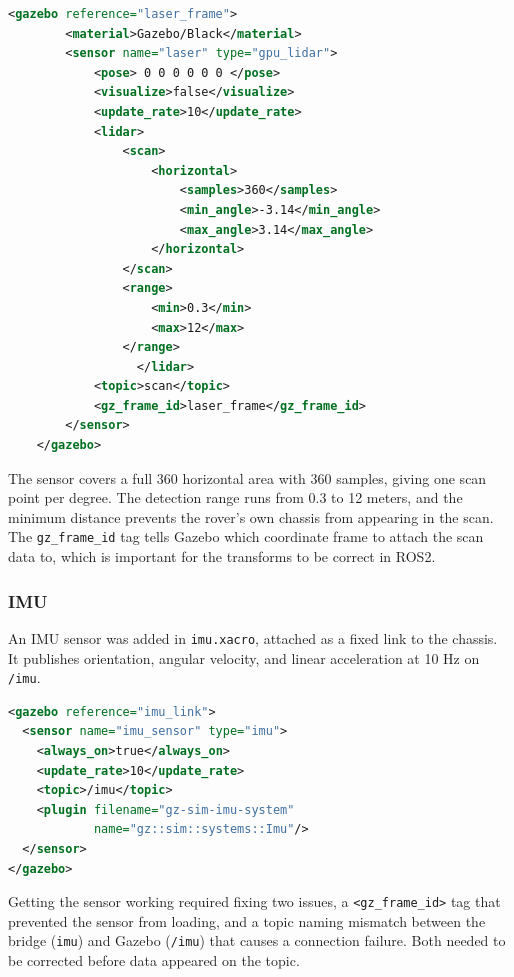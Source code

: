 \begin{lstlisting}[language=XML, caption={Gazebo LiDAR sensor configuration}]
<gazebo reference="laser_frame">
        <material>Gazebo/Black</material>
        <sensor name="laser" type="gpu_lidar">
            <pose> 0 0 0 0 0 0 </pose>
            <visualize>false</visualize>
            <update_rate>10</update_rate>
            <lidar>
                <scan>
                    <horizontal>
                        <samples>360</samples>
                        <min_angle>-3.14</min_angle>
                        <max_angle>3.14</max_angle>
                    </horizontal>
                </scan>
                <range>
                    <min>0.3</min>
                    <max>12</max>
                </range>
                  </lidar>
            <topic>scan</topic>
            <gz_frame_id>laser_frame</gz_frame_id>
        </sensor>
    </gazebo>
\end{lstlisting}

The sensor covers a full 360 horizontal area with 360 samples, giving one scan point per degree. The detection range runs from 0.3 to 12 meters, and the minimum distance prevents the rover's own chassis from appearing in the scan. The \texttt{gz\_frame\_id} tag tells Gazebo which coordinate frame to attach the scan data to, which is important for the transforms to be correct in ROS2.

\subsubsection{IMU}

An IMU sensor was added in \texttt{imu.xacro}, attached as a fixed link to the chassis. It publishes orientation, angular velocity, and linear acceleration at 10 Hz on \texttt{/imu}.

\begin{lstlisting}[language=XML, caption={Gazebo IMU sensor configuration}]
<gazebo reference="imu_link">
  <sensor name="imu_sensor" type="imu">
    <always_on>true</always_on>
    <update_rate>10</update_rate>
    <topic>/imu</topic>
    <plugin filename="gz-sim-imu-system"
            name="gz::sim::systems::Imu"/>
  </sensor>
</gazebo>
\end{lstlisting}

Getting the sensor working required fixing two issues, a \texttt{<gz\_frame\_id>} tag that prevented the sensor from loading, and a topic naming mismatch between the bridge (\texttt{imu}) and Gazebo (\texttt{/imu}) that causes a connection failure. Both needed to be corrected before data appeared on the topic.


